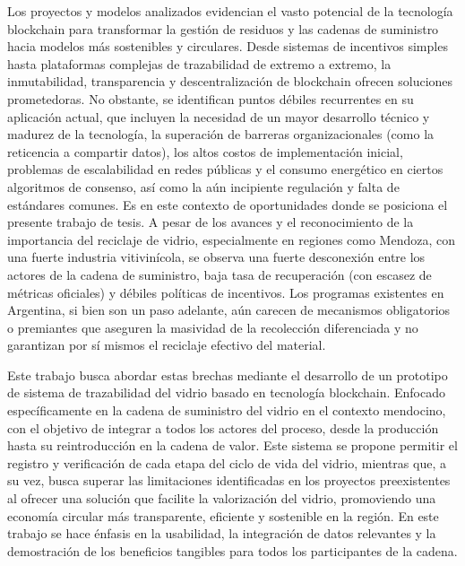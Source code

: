 Los proyectos y modelos analizados evidencian el vasto potencial de la tecnología blockchain para transformar la gestión de residuos y las cadenas de suministro hacia modelos más sostenibles y circulares. Desde sistemas de incentivos simples hasta plataformas complejas de trazabilidad de extremo a extremo, la inmutabilidad, transparencia y descentralización de blockchain ofrecen soluciones prometedoras. No obstante, se identifican puntos débiles recurrentes en su aplicación actual, que incluyen la necesidad de un mayor desarrollo técnico y madurez de la tecnología, la superación de barreras organizacionales (como la reticencia a compartir datos), los altos costos de implementación inicial, problemas de escalabilidad en redes públicas y el consumo energético en ciertos algoritmos de consenso, así como la aún incipiente regulación y falta de estándares comunes. Es en este contexto de oportunidades donde se posiciona el presente trabajo de tesis. A pesar de los avances y el reconocimiento de la importancia del reciclaje de vidrio, especialmente en regiones como Mendoza, con una fuerte industria vitivinícola, se observa una fuerte desconexión entre los actores de la cadena de suministro, baja tasa de recuperación (con escasez de métricas oficiales) y débiles políticas de incentivos. Los programas existentes en Argentina, si bien son un paso adelante, aún carecen de mecanismos obligatorios o premiantes que aseguren la masividad de la recolección diferenciada y no garantizan por sí mismos el reciclaje efectivo del material.

Este trabajo busca abordar estas brechas mediante el desarrollo de un prototipo de sistema de trazabilidad del vidrio basado en tecnología blockchain. Enfocado específicamente en la cadena de suministro del vidrio en el contexto mendocino, con el objetivo de integrar a todos los actores del proceso, desde la producción hasta su reintroducción en la cadena de valor. Este sistema se propone permitir el registro y verificación de cada etapa del ciclo de vida del vidrio, mientras que, a su vez, busca superar las limitaciones identificadas en los proyectos preexistentes al ofrecer una solución que facilite la valorización del vidrio, promoviendo una economía circular más transparente, eficiente y sostenible en la región. En este trabajo se hace énfasis en la usabilidad, la integración de datos relevantes y la demostración de los beneficios tangibles para todos los participantes de la cadena.
